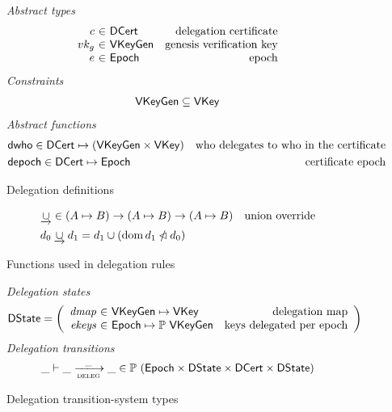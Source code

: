 \begin{figure}
  \emph{Abstract types}
  \begin{equation*}
    \begin{array}{r@{~\in~}lr}
      c & \DCert & \text{delegation certificate}\\
      vk_g & \VKeyGen & \text{genesis verification key}\\
      e & \Epoch & \text{epoch}\\
    \end{array}
  \end{equation*}
  \emph{Constraints}
  \begin{align*}
    \mathsf{VKeyGen} \subseteq \mathsf{VKey}
  \end{align*}
  \emph{Abstract functions}
  \begin{align*}
    & \mathsf{dwho} \in \mathsf{DCert} \mapsto (\mathsf{VKeyGen} \times \mathsf{VKey}) & \text{who delegates to who in the certificate}\\
    & \mathsf{depoch} \in \mathsf{DCert} \mapsto \mathsf{Epoch} & \text{certificate epoch}
  \end{align*}
  \caption{Delegation definitions}
  \label{fig:delegation-defs}
\end{figure}

\begin{figure}
  \begin{align*}
    & \mathbin{\underrightarrow\cup} \in (A \mapsto B) \to (A \mapsto B) \to (A \mapsto B)
    & \text{union override}\\
    & d_0 \mathbin{\underrightarrow\cup} d_1 = d_1 \cup (\operatorname{dom} d_1 \mathbin{\slashed{\lhd}} d_0)
  \end{align*}
  \caption{Functions used in delegation rules}
  \label{fig:delegation-funcs}
\end{figure}

\begin{figure}
  \emph{Delegation states}
  \begin{align*}
    & \DState
      = \left(
        \begin{array}{r@{~\in~}lr}
          \var{dmap} & \VKeyGen \mapsto \VKey & \text{delegation map}\\
          \var{ekeys} & \Epoch \mapsto \powerset{\VKeyGen} & \text{keys delegated per epoch}
        \end{array}\right)
  \end{align*}
  \emph{Delegation transitions}
  \begin{equation*}
    \_ \vdash \_ \trans{deleg}{\_} \_ \in
      \powerset (\Epoch \times \DState \times \DCert \times \DState)
    \end{equation*}
  \caption{Delegation transition-system types}
  \label{fig:delegation-ts-types}
\end{figure}

